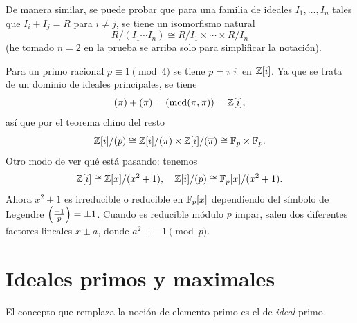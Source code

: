 De manera similar, se puede probar que para una familia de ideales
$I_1,\ldots,I_n$ tales que $I_i + I_j = R$ para $i\ne j$, se tiene un isomorfismo
natural
$$R/(I_1\cdots I_n) \cong R/I_1 \times \cdots \times R/I_n$$
(he tomado $n = 2$ en la prueba se arriba solo para simplificar la notación).

\begin{ejemplo}
  Para un primo racional $p \equiv 1 \pmod{4}$ se tiene
  $p = \pi\,\overline{\pi}$ en $\mathbb{Z}[i]$. Ya que se trata de un dominio
  de ideales principales, se tiene
  $$(\pi) + (\overline{\pi}) = (\operatorname{mcd} (\pi, \overline{\pi})) = \mathbb{Z}[i],$$
  así que por el teorema chino del resto
  \[ \mathbb{Z}[i]/(p) \cong \mathbb{Z}[i]/(\pi) \times \mathbb{Z}[i]/(\overline{\pi})
                \cong \mathbb{F}_p\times \mathbb{F}_p. \]
  Otro modo de ver qué está pasando: tenemos
  $$\mathbb{Z}[i] \cong \mathbb{Z}[x]/(x^2+1), \quad \mathbb{Z}[i]/(p) \cong \mathbb{F}_p [x]/(x^2+1).$$
  Ahora $x^2 + 1$ es irreducible o reducible en $\mathbb{F}_p [x]$ dependiendo del
  símbolo de Legendre $\left(\frac{-1}{p}\right) = \pm 1$. Cuando es reducible módulo $p$
  impar, salen dos diferentes factores lineales $x \pm a$, donde $a^2 \equiv -1
  \pmod{p}$.
\end{ejemplo}


\section{Ideales primos y maximales}

El concepto que remplaza la noción de elemento primo es el de \emph{ideal} primo.


